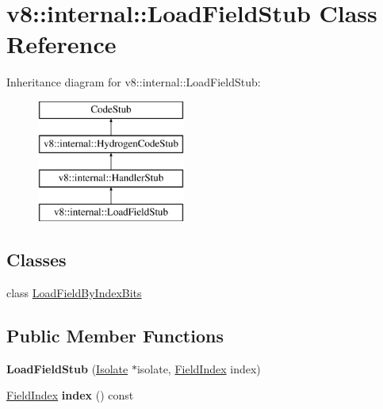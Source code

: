 \hypertarget{classv8_1_1internal_1_1_load_field_stub}{}\section{v8\+:\+:internal\+:\+:Load\+Field\+Stub Class Reference}
\label{classv8_1_1internal_1_1_load_field_stub}
Inheritance diagram for v8\+:\+:internal\+:\+:Load\+Field\+Stub\+:\begin{figure}[H]
\begin{center}
\leavevmode
\includegraphics[height=4.000000cm]{classv8_1_1internal_1_1_load_field_stub}
\end{center}
\end{figure}
\subsection*{Classes}
\begin{DoxyCompactItemize}
\item 
class \hyperlink{classv8_1_1internal_1_1_load_field_stub_1_1_load_field_by_index_bits}{Load\+Field\+By\+Index\+Bits}
\end{DoxyCompactItemize}
\subsection*{Public Member Functions}
\begin{DoxyCompactItemize}
\item 
{\bfseries Load\+Field\+Stub} (\hyperlink{classv8_1_1internal_1_1_isolate}{Isolate} $\ast$isolate, \hyperlink{classv8_1_1internal_1_1_field_index}{Field\+Index} index)\hypertarget{classv8_1_1internal_1_1_load_field_stub_a7e59d0b99f6ad876cce69bffa9e21c6a}{}\label{classv8_1_1internal_1_1_load_field_stub_a7e59d0b99f6ad876cce69bffa9e21c6a}

\item 
\hyperlink{classv8_1_1internal_1_1_field_index}{Field\+Index} {\bfseries index} () const \hypertarget{classv8_1_1internal_1_1_load_field_stub_a931b1f06ba32b0681707c69bf2014762}{}\label{classv8_1_1internal_1_1_load_field_stub_a931b1f06ba32b0681707c69bf2014762}

\end{DoxyCompactItemize}
